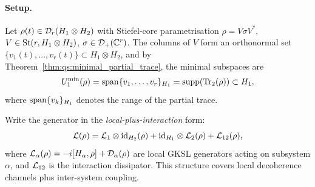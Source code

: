 \paragraph{Setup.}
Let $\rho(t) \in \mathcal{D}_{r}(H_1 \otimes H_2)$ with Stiefel-core
parametrisation $\rho = V\sigma V^*$, $V \in \mathrm{St}(r,H_1 \otimes H_2)$,
$\sigma \in \mathcal{D}_+(\mathbb{C}^r)$. The columns of $V$ form an orthonormal set
$\{v_1(t), \ldots, v_r(t)\} \subset H_1 \otimes H_2$, and by
Theorem~\ref{thm:qs:minimal_partial_trace}, the minimal subspaces are
\begin{equation}
    U^{\min}_{1}(\rho) = \mathrm{span}\{v_1, \ldots, v_r\}_{H_1}
    = \mathrm{supp}(\mathrm{Tr}_2(\rho))
    \subset H_1,
\end{equation}
where $\mathrm{span}\{v_k\}_{H_1}$ denotes the range of the partial trace.

Write the generator in the \emph{local-plus-interaction} form:
\begin{equation}
\label{eq:lind:bipartite_gen}
    \mathcal{L}(\rho)
    = \mathcal{L}_1 \otimes \mathrm{id}_{H_2}(\rho)
    + \mathrm{id}_{H_1} \otimes \mathcal{L}_2(\rho)
    + \mathcal{L}_{12}(\rho),
\end{equation}
where $\mathcal{L}_\alpha(\rho) = -i[H_\alpha, \rho] + \mathcal{D}_\alpha(\rho)$
are local GKSL generators acting on subsystem $\alpha$, and
$\mathcal{L}_{12}$ is the interaction dissipator. This structure covers
local decoherence channels plus inter-system coupling.

